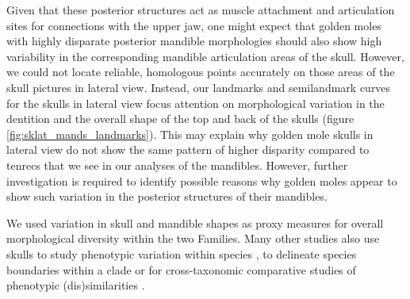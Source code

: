 \documentclass[12pt,a4paper]{article}
\begin{document}
	 Given that these posterior structures act as muscle attachment and articulation sites for connections with the upper jaw, %
	 one might expect that golden moles with highly disparate posterior mandible morphologies should also show high variability in the corresponding mandible articulation areas of the skull. However, we could not locate reliable, homologous points accurately on those areas of the skull pictures in lateral view. Instead, our landmarks and semilandmark curves for the skulls in lateral view focus attention on morphological variation in the dentition and the overall shape of the top and back of the skulls (figure \ref{fig:sklat_mands_landmarks}). This may explain why golden mole skulls in lateral view do not show the same pattern of higher disparity compared to tenrecs that we see in our analyses of the mandibles. However, further investigation is required to identify possible reasons why golden moles appear to show such variation in the posterior structures of their mandibles.
	 	
	
	
	
	
	We used variation in skull and mandible shapes as proxy measures for overall morphological diversity within the two Families. Many other studies also use skulls to study phenotypic variation within species \citep{Blagojevic2011, Bornholdt2008}, to delineate species boundaries within a clade \citep[e.g.][]{Panchetti2008} or for cross-taxonomic comparative studies of phenotypic (dis)similarities \citep[e.g.][]{Ruta2013, Goswami2011, Wroe2007}.
	
\end{document}
